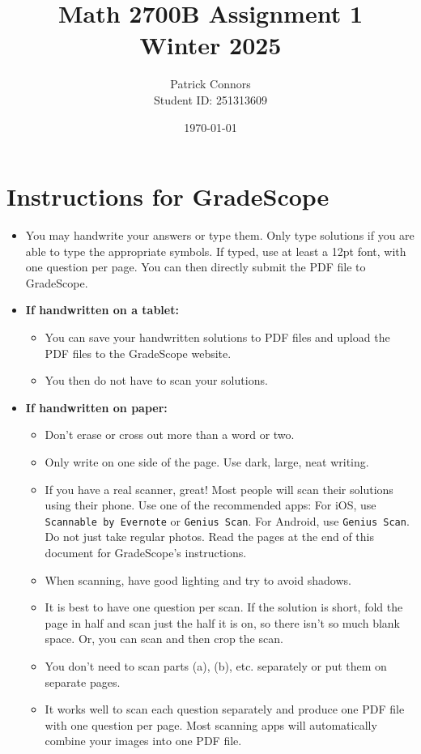 \documentclass[12pt]{article}
\title{Math 2700B Assignment 1 \\ Winter 2025}
\author{Patrick Connors \\ Student ID: 251313609}
\date{\today}
\begin{document}
\maketitle

\section*{Instructions for GradeScope}

\begin{itemize}
    \item You may handwrite your answers or type them. Only type solutions if you are able to type the appropriate symbols. If typed, use at least a 12pt font, with one question per page. You can then directly submit the PDF file to GradeScope.
    \item \textbf{If handwritten on a tablet:}
    \begin{itemize}
        \item You can save your handwritten solutions to PDF files and upload the PDF files to the GradeScope website.
        \item You then do not have to scan your solutions.
    \end{itemize}
    \item \textbf{If handwritten on paper:}
    \begin{itemize}
        \item Don’t erase or cross out more than a word or two.
        \item Only write on one side of the page. Use dark, large, neat writing.
        \item If you have a real scanner, great! Most people will scan their solutions using their phone. Use one of the recommended apps: For iOS, use \texttt{Scannable by Evernote} or \texttt{Genius Scan}. For Android, use \texttt{Genius Scan}. Do not just take regular photos. Read the pages at the end of this document for GradeScope’s instructions.
        \item When scanning, have good lighting and try to avoid shadows.
        \item It is best to have one question per scan. If the solution is short, fold the page in half and scan just the half it is on, so there isn’t so much blank space. Or, you can scan and then crop the scan.
        \item You don’t need to scan parts (a), (b), etc. separately or put them on separate pages.
        \item It works well to scan each question separately and produce one PDF file with one question per page. Most scanning apps will automatically combine your images into one PDF file.

\end{itemize}
\end{itemize}
\end{document}
